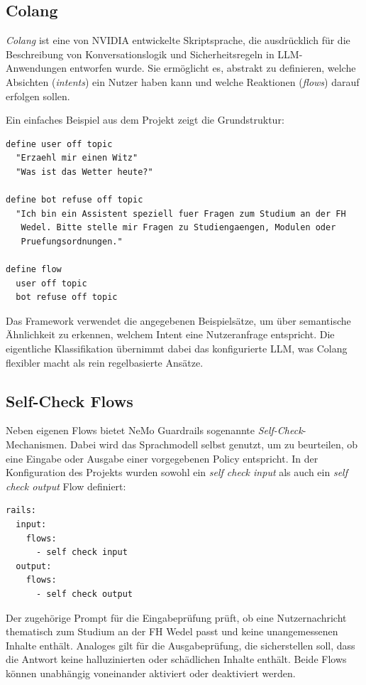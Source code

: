 \subsection{Colang}

\emph{Colang} ist eine von NVIDIA entwickelte Skriptsprache, die ausdrücklich für die
Beschreibung von Konversationslogik und Sicherheitsregeln in LLM-Anwendungen entworfen wurde.
Sie ermöglicht es, abstrakt zu definieren, welche Absichten (\emph{intents}) ein Nutzer haben kann und
welche Reaktionen (\emph{flows}) darauf erfolgen sollen.

Ein einfaches Beispiel aus dem Projekt zeigt die Grundstruktur:

\begin{lstlisting}[caption={Colang-Definition für Off-Topic-Abweisung}]
define user off topic
  "Erzaehl mir einen Witz"
  "Was ist das Wetter heute?"

define bot refuse off topic
  "Ich bin ein Assistent speziell fuer Fragen zum Studium an der FH
   Wedel. Bitte stelle mir Fragen zu Studiengaengen, Modulen oder
   Pruefungsordnungen."

define flow
  user off topic
  bot refuse off topic
\end{lstlisting}

Das Framework verwendet die angegebenen Beispielsätze, um über semantische Ähnlichkeit
zu erkennen, welchem Intent eine Nutzeranfrage entspricht. Die eigentliche Klassifikation
übernimmt dabei das konfigurierte LLM, was Colang flexibler macht als rein regelbasierte Ansätze.

\subsection{Self-Check Flows}

Neben eigenen Flows bietet NeMo Guardrails sogenannte \emph{Self-Check}-Mechanismen. Dabei
wird das Sprachmodell selbst genutzt, um zu beurteilen, ob eine Eingabe oder Ausgabe einer
vorgegebenen Policy entspricht. In der Konfiguration des Projekts wurden sowohl ein
\emph{self check input} als auch ein \emph{self check output} Flow definiert:

\begin{lstlisting}[caption={Ausschnitt aus config.yml}]
rails:
  input:
    flows:
      - self check input
  output:
    flows:
      - self check output
\end{lstlisting}

Der zugehörige Prompt für die Eingabeprüfung prüft, ob eine Nutzernachricht thematisch zum
Studium an der FH Wedel passt und keine unangemessenen Inhalte enthält. Analoges gilt für
die Ausgabeprüfung, die sicherstellen soll, dass die Antwort keine halluzinierten oder
schädlichen Inhalte enthält. Beide Flows können unabhängig voneinander aktiviert oder
deaktiviert werden.

